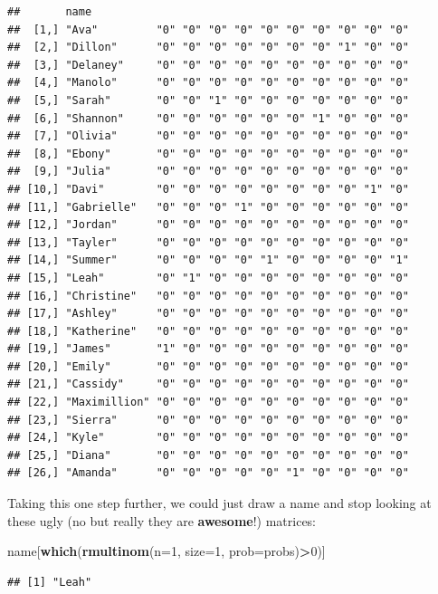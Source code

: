 \documentclass[
]{book}
\newenvironment{Shaded}{\begin{snugshade}}{\end{snugshade}}
\newcommand{\DataTypeTok}[1]{\textcolor[rgb]{0.13,0.29,0.53}{#1}}
\newcommand{\DecValTok}[1]{\textcolor[rgb]{0.00,0.00,0.81}{#1}}
\newcommand{\KeywordTok}[1]{\textcolor[rgb]{0.13,0.29,0.53}{\textbf{#1}}}
\newcommand{\NormalTok}[1]{#1}
\newcommand{\OperatorTok}[1]{\textcolor[rgb]{0.81,0.36,0.00}{\textbf{#1}}}
\begin{document}
\begin{verbatim}
##       name                                                 
##  [1,] "Ava"         "0" "0" "0" "0" "0" "0" "0" "0" "0" "0"
##  [2,] "Dillon"      "0" "0" "0" "0" "0" "0" "0" "1" "0" "0"
##  [3,] "Delaney"     "0" "0" "0" "0" "0" "0" "0" "0" "0" "0"
##  [4,] "Manolo"      "0" "0" "0" "0" "0" "0" "0" "0" "0" "0"
##  [5,] "Sarah"       "0" "0" "1" "0" "0" "0" "0" "0" "0" "0"
##  [6,] "Shannon"     "0" "0" "0" "0" "0" "0" "1" "0" "0" "0"
##  [7,] "Olivia"      "0" "0" "0" "0" "0" "0" "0" "0" "0" "0"
##  [8,] "Ebony"       "0" "0" "0" "0" "0" "0" "0" "0" "0" "0"
##  [9,] "Julia"       "0" "0" "0" "0" "0" "0" "0" "0" "0" "0"
## [10,] "Davi"        "0" "0" "0" "0" "0" "0" "0" "0" "1" "0"
## [11,] "Gabrielle"   "0" "0" "0" "1" "0" "0" "0" "0" "0" "0"
## [12,] "Jordan"      "0" "0" "0" "0" "0" "0" "0" "0" "0" "0"
## [13,] "Tayler"      "0" "0" "0" "0" "0" "0" "0" "0" "0" "0"
## [14,] "Summer"      "0" "0" "0" "0" "1" "0" "0" "0" "0" "1"
## [15,] "Leah"        "0" "1" "0" "0" "0" "0" "0" "0" "0" "0"
## [16,] "Christine"   "0" "0" "0" "0" "0" "0" "0" "0" "0" "0"
## [17,] "Ashley"      "0" "0" "0" "0" "0" "0" "0" "0" "0" "0"
## [18,] "Katherine"   "0" "0" "0" "0" "0" "0" "0" "0" "0" "0"
## [19,] "James"       "1" "0" "0" "0" "0" "0" "0" "0" "0" "0"
## [20,] "Emily"       "0" "0" "0" "0" "0" "0" "0" "0" "0" "0"
## [21,] "Cassidy"     "0" "0" "0" "0" "0" "0" "0" "0" "0" "0"
## [22,] "Maximillion" "0" "0" "0" "0" "0" "0" "0" "0" "0" "0"
## [23,] "Sierra"      "0" "0" "0" "0" "0" "0" "0" "0" "0" "0"
## [24,] "Kyle"        "0" "0" "0" "0" "0" "0" "0" "0" "0" "0"
## [25,] "Diana"       "0" "0" "0" "0" "0" "0" "0" "0" "0" "0"
## [26,] "Amanda"      "0" "0" "0" "0" "0" "1" "0" "0" "0" "0"
\end{verbatim}

Taking this one step further, we could just draw a name and stop looking at these ugly (no but really they are \textbf{awesome}!) matrices:

\begin{Shaded}
\begin{Highlighting}[]
\NormalTok{name[}\KeywordTok{which}\NormalTok{(}\KeywordTok{rmultinom}\NormalTok{(}\DataTypeTok{n=}\DecValTok{1}\NormalTok{, }\DataTypeTok{size=}\DecValTok{1}\NormalTok{, }\DataTypeTok{prob=}\NormalTok{probs)}\OperatorTok{>}\DecValTok{0}\NormalTok{)]}
\end{Highlighting}
\end{Shaded}

\begin{verbatim}
## [1] "Leah"
\end{verbatim}
\end{document}
